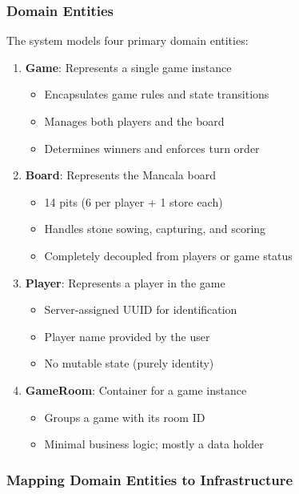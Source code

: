 \documentclass{scrartcl}
\begin{document}
\subsubsection{Domain Entities}

The system models four primary domain entities:

\begin{enumerate}
  \item \textbf{Game}: Represents a single game instance
  \begin{itemize}
    \item Encapsulates game rules and state transitions
    \item Manages both players and the board
    \item Determines winners and enforces turn order
  \end{itemize}

  \item \textbf{Board}: Represents the Mancala board
  \begin{itemize}
    \item 14 pits (6 per player + 1 store each)
    \item Handles stone sowing, capturing, and scoring
    \item Completely decoupled from players or game status
  \end{itemize}

  \item \textbf{Player}: Represents a player in the game
  \begin{itemize}
    \item Server-assigned UUID for identification
    \item Player name provided by the user
    \item No mutable state (purely identity)
  \end{itemize}

  \item \textbf{GameRoom}: Container for a game instance
  \begin{itemize}
    \item Groups a game with its room ID
    \item Minimal business logic; mostly a data holder
  \end{itemize}
\end{enumerate}

\subsubsection{Mapping Domain Entities to Infrastructure}
\end{document}
